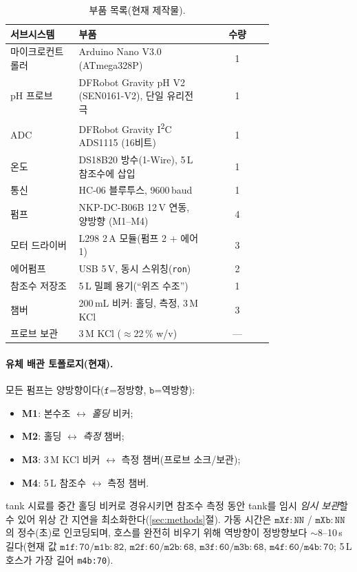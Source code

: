 \documentclass[11pt]{article}
\begin{document}
\begin{table}[t]
\centering
\caption{부품 목록(현재 제작물).}
\label{tab:bom}
\footnotesize
\begin{tabular}{@{}p{0.26\linewidth} p{0.50\linewidth} c@{}}
\toprule
서브시스템 & 부품 & 수량 \\
\midrule
마이크로컨트롤러 & Arduino Nano V3.0 (ATmega328P) & 1 \\
pH 프로브 & DFRobot Gravity pH V2 (SEN0161-V2), 단일 유리전극 & 1 \\
ADC & DFRobot Gravity I\textsuperscript{2}C ADS1115 (16비트) & 1 \\
온도 & DS18B20 방수(1-Wire), 5\,L 참조수에 삽입 & 1 \\
통신 & HC-06 블루투스, 9600\,baud & 1 \\
펌프 & NKP-DC-B06B 12\,V 연동, 양방향 (M1--M4) & 4 \\
모터 드라이버 & L298 2\,A 모듈(펌프 2 + 에어 1) & 3 \\
에어펌프 & USB 5\,V, 동시 스위칭(\texttt{ron}) & 2 \\
참조수 저장조 & 5\,L 밀폐 용기(``위즈 수조'') & 1 \\
챔버 & 200\,mL 비커: 홀딩, 측정, 3\,M KCl & 3 \\
프로브 보관 & 3\,M KCl ($\approx$22\,\% w/v) & --- \\
\bottomrule
\end{tabular}
\end{table}

\paragraph{유체 배관 토폴로지(현재).} 모든 펌프는 양방향이다($\mathtt{f}$=정방향,
$\mathtt{b}$=역방향):
\begin{itemize}[nosep,leftmargin=1.4em]
\item \textbf{M1}: 본수조 $\leftrightarrow$ \emph{홀딩} 비커;
\item \textbf{M2}: 홀딩 $\leftrightarrow$ \emph{측정} 챔버;
\item \textbf{M3}: 3\,M KCl 비커 $\leftrightarrow$ 측정 챔버(프로브 소크/보관);
\item \textbf{M4}: 5\,L 참조수 $\leftrightarrow$ 측정 챔버.
\end{itemize}
tank 시료를 중간 홀딩 비커로 경유시키면 참조수 측정 동안 tank를 임시
\emph{임시 보관}할 수 있어 위상 간 지연을 최소화한다(\ref{sec:methods}절). 가동 시간은
$\mathtt{mXf{:}NN}$ / $\mathtt{mXb{:}NN}$의 정수(초)로 인코딩되며, 호스를 완전히
비우기 위해 역방향이 정방향보다 $\sim$8--10\,s 길다(현재 값
$\mathtt{m1f{:}70/m1b{:}82}$, $\mathtt{m2f{:}60/m2b{:}68}$,
$\mathtt{m3f{:}60/m3b{:}68}$, $\mathtt{m4f{:}60/m4b{:}70}$; 5\,L 호스가 가장 길어
\texttt{m4b:70}).
\end{document}
